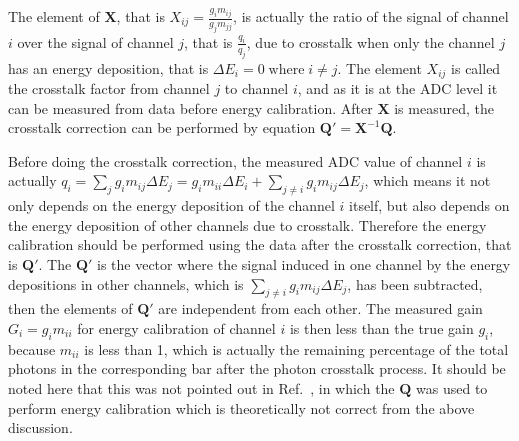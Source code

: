 \documentclass[preprint,sort&compress,12pt]{elsarticle}
\begin{document}
The element of $\bm{X}$, that is $X_{ij} = \frac{g_i m_{ij}}{g_j m_{jj}}$, is actually the ratio of the signal of channel $i$ over the signal of channel $j$, that is $\frac{q_i}{q_j}$, due to crosstalk when only the channel $j$ has an energy deposition, that is $\Delta E_i = 0\; \text{where}\; i \neq j$. The element $X_{ij}$ is called the crosstalk factor from channel $j$ to channel $i$, and as it is at the ADC level it can be measured from data before energy calibration. After $\bm{X}$ is measured, the crosstalk correction can be performed by equation $\bm{Q'} = \bm{X}^{-1}\bm{Q}$.

Before doing the crosstalk correction, the measured ADC value of channel $i$ is actually $q_i = \sum_j g_i m_{ij} \Delta E_j = g_i m_{ii} \Delta E_i + \sum_{j\neq i} g_i m_{ij} \Delta E_j$, which means it not only depends on the energy deposition of the channel $i$ itself, but also depends on the energy deposition of other channels due to crosstalk. Therefore the energy calibration should be performed using the data after the crosstalk correction, that is $\bm{Q'}$. The $\bm{Q'}$ is the vector where the signal induced in one channel by the energy depositions in other channels, which is $\sum_{j\neq i} g_i m_{ij} \Delta E_j$, has been subtracted, then the elements of $\bm{Q'}$ are independent from each other. The measured gain $G_i = g_i m_{ii}$ for energy calibration of channel $i$ is then less than the true gain $g_i$, because $m_{ii}$ is less than 1, which is actually the remaining percentage of the total photons in the corresponding bar after the photon crosstalk process. It should be noted here that this was not pointed out in Ref.~\cite{Xiao2016}, in which the $\bm{Q}$ was used to perform energy calibration which is theoretically not correct from the above discussion.
\end{document}
